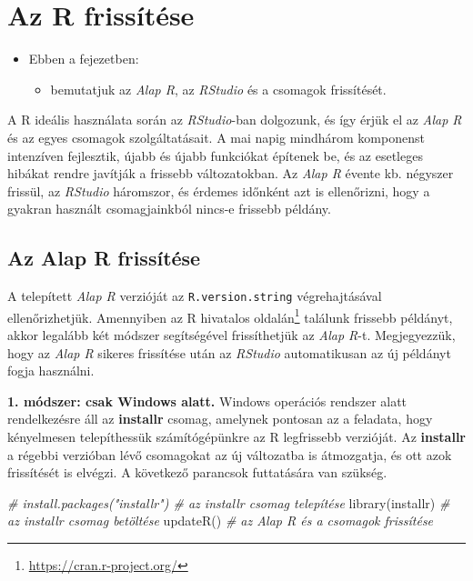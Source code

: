 \documentclass[
]{book}
\newenvironment{Shaded}{\begin{snugshade}}{\end{snugshade}}
\newcommand{\CommentTok}[1]{\textcolor[rgb]{0.56,0.35,0.01}{\textit{#1}}}
\newcommand{\FunctionTok}[1]{\textcolor[rgb]{0.00,0.00,0.00}{#1}}
\newcommand{\NormalTok}[1]{#1}
\DeclareRobustCommand{\href}[2]{#2\footnote{\url{#1}}}
\providecommand{\tightlist}{%
  \setlength{\itemsep}{0pt}\setlength{\parskip}{0pt}}
\newenvironment{rmdblock}[1]
  {\begin{shaded*}
  \begin{itemize}
  \renewcommand{\labelitemi}{
    \raisebox{-.7\height}[0pt][0pt]{
      {\setkeys{Gin}{width=3em,keepaspectratio}\texttt{[image: images/\#1]}}
    }
  }
  \item
  }
  {
  \end{itemize}
  \end{shaded*}
  }
\newenvironment{rmdlevel3}
  {\begin{rmdblock}{level3}}
  {\end{rmdblock}}
\begin{document}
\hypertarget{az-r-frissuxedtuxe9se}{%
\section{Az R frissítése}\label{az-r-frissuxedtuxe9se}}

\begin{rmdlevel3}
Ebben a fejezetben:

\begin{itemize}
\tightlist
\item
  bemutatjuk az \emph{Alap R}, az \emph{RStudio} és a csomagok
  frissítését.
\end{itemize}
\end{rmdlevel3}

A R ideális használata során az \emph{RStudio}-ban dolgozunk, és így érjük el az \emph{Alap R} és az egyes csomagok szolgáltatásait. A mai napig mindhárom komponenst intenzíven fejlesztik, újabb és újabb funkciókat építenek be, és az esetleges hibákat rendre javítják a frissebb változatokban. Az \emph{Alap R} évente kb. négyszer frissül, az \emph{RStudio} háromszor, és érdemes időnként azt is ellenőrizni, hogy a gyakran használt csomagjainkból nincs-e frissebb példány.

\hypertarget{az-alap-r-frissuxedtuxe9se}{%
\subsection{Az Alap R frissítése}\label{az-alap-r-frissuxedtuxe9se}}

A telepített \emph{Alap R} verzióját az \texttt{R.version.string} végrehajtásával ellenőrizhetjük. Amennyiben az R hivatalos \href{https://cran.r-project.org/}{oldalán} találunk frissebb példányt, akkor legalább két módszer segítségével frissíthetjük az \emph{Alap R}-t. Megjegyezzük, hogy az \emph{Alap R} sikeres frissítése után az \emph{RStudio} automatikusan az új példányt fogja használni.

\textbf{1. módszer: csak Windows alatt.} Windows operációs rendszer alatt rendelkezésre áll az \textbf{installr} csomag, amelynek pontosan az a feladata, hogy kényelmesen telepíthessük számítógépünkre az R legfrissebb verzióját. Az \textbf{installr} a régebbi verzióban lévő csomagokat az új változatba is átmozgatja, és ott azok frissítését is elvégzi. A következő parancsok futtatására van szükség.

\begin{Shaded}
\begin{Highlighting}[]
\CommentTok{\# install.packages("installr") \# az installr csomag telepítése}
\FunctionTok{library}\NormalTok{(installr)              }\CommentTok{\# az installr csomag betöltése}
\FunctionTok{updateR}\NormalTok{()                      }\CommentTok{\# az Alap R és a csomagok frissítése}
\end{Highlighting}
\end{Shaded}
\end{document}
